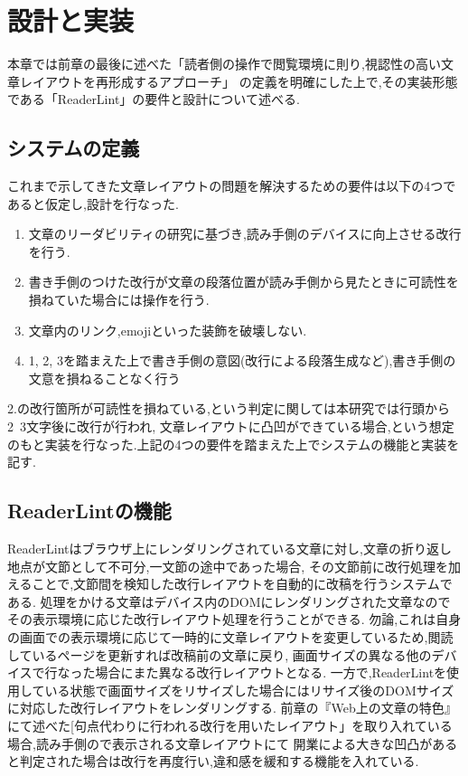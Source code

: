 

\chapter{設計と実装}
\label{chap:system}
本章では前章の最後に述べた「読者側の操作で閲覧環境に則り,視認性の高い文章レイアウトを再形成するアプローチ」
の定義を明確にした上で,その実装形態である「ReaderLint」の要件と設計について述べる.
\newpage

\section{システムの定義}
これまで示してきた文章レイアウトの問題を解決するための要件は以下の4つであると仮定し,設計を行なった.
\begin{enumerate}
	\item 文章のリーダビリティの研究に基づき,読み手側のデバイスに向上させる改行を行う.
	\item 書き手側のつけた改行が文章の段落位置が読み手側から見たときに可読性を損ねていた場合には操作を行う.
	\item 文章内のリンク,emojiといった装飾を破壊しない.
	\item 1, 2, 3を踏まえた上で書き手側の意図(改行による段落生成など),書き手側の文意を損ねることなく行う
\end{enumerate}
2.の改行箇所が可読性を損ねている,という判定に関しては本研究では行頭から2~3文字後に改行が行われ,
文章レイアウトに凸凹ができている場合,という想定のもと実装を行なった.上記の4つの要件を踏まえた上でシステムの機能と実装を記す.

\section{ReaderLintの機能}
ReaderLintはブラウザ上にレンダリングされている文章に対し,文章の折り返し地点が文節として不可分,一文節の途中であった場合,
その文節前に改行処理を加えることで,文節間を検知した改行レイアウトを自動的に改稿を行うシステムである.
処理をかける文章はデバイス内のDOMにレンダリングされた文章なのでその表示環境に応じた改行レイアウト処理を行うことができる.
勿論,これは自身の画面での表示環境に応じて一時的に文章レイアウトを変更しているため,閲読しているページを更新すれば改稿前の文章に戻り,
画面サイズの異なる他のデバイスで行なった場合にまた異なる改行レイアウトとなる.
一方で,ReaderLintを使用している状態で画面サイズをリサイズした場合にはリサイズ後のDOMサイズに対応した改行レイアウトをレンダリングする.
前章の『Web上の文章の特色』にて述べた[句点代わりに行われる改行を用いたレイアウト」を取り入れている場合,読み手側ので表示される文章レイアウトにて
開業による大きな凹凸があると判定された場合は改行を再度行い,違和感を緩和する機能を入れている.

